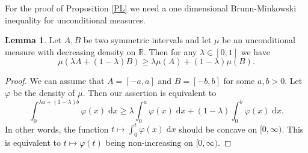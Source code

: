 \documentclass[11pt]{article}
\newcommand{\call}[4]{\int_{#1}^{#2} {#3} \; \textrm{d} {#4}}
\newcommand{\mb}[1]{\mathbb{{#1}}}
\newcommand{\1}{\mathbf{{1}}}
\newcommand{\vp}{\varphi}
\theoremstyle{definition}
\newtheorem{lem}{Lemma}
\begin{document}
\noindent For the proof of Proposition \ref{PL} we need a one dimensional Brunn-Minkowski inequality for unconditional measures.

\begin{lem}\label{dim1}
Let $A,B$ be two symmetric intervals and let $\mu$ be an unconditional measure with decreasing density on $\mb{R}$. Then for any $\lambda \in [0,1]$ we have
\[
	\mu(\lambda A + (1-\lambda)B) \geq \lambda \mu(A)+(1-\lambda) \mu(B).
\]	
\end{lem}
\begin{proof}
We can assume that $A=[-a,a]$ and $B=[-b,b]$ for some $a,b>0$. Let $\vp$ be the density of $\mu$. Then our assertion is equivalent to
\[
	\call{0}{\lambda a + (1-\lambda) b}{\vp(x)}{x} \geq  \lambda \call{0}{ a}{\vp(x)}{x} + (1-\lambda)\call{0}{ b}{\vp(x)}{x}.
\]
In other words, the function $t \mapsto \call{0}{t}{\vp(x)}{x}$ should be concave on $[0,\infty)$. This is equivalent to $t \mapsto \vp(t)$ being non-increasing on $[0,\infty)$.
\end{proof}
\end{document}
